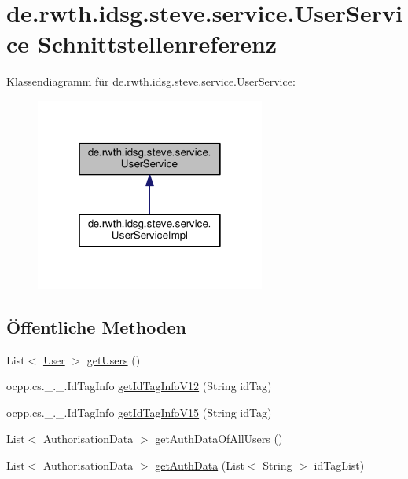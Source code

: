 \hypertarget{interfacede_1_1rwth_1_1idsg_1_1steve_1_1service_1_1_user_service}{\section{de.\-rwth.\-idsg.\-steve.\-service.\-User\-Service Schnittstellenreferenz}
\label{interfacede_1_1rwth_1_1idsg_1_1steve_1_1service_1_1_user_service}
}


Klassendiagramm für de.\-rwth.\-idsg.\-steve.\-service.\-User\-Service\-:
\nopagebreak
\begin{figure}[H]
\begin{center}
\leavevmode
\includegraphics[width=214pt]{interfacede_1_1rwth_1_1idsg_1_1steve_1_1service_1_1_user_service__inherit__graph}
\end{center}
\end{figure}
\subsection*{Öffentliche Methoden}
\begin{DoxyCompactItemize}
\item 
List$<$ \hyperlink{classde_1_1rwth_1_1idsg_1_1steve_1_1repository_1_1dto_1_1_user}{User} $>$ \hyperlink{interfacede_1_1rwth_1_1idsg_1_1steve_1_1service_1_1_user_service_ad1e17f9e1ba85c0f8cdaddf6ad1e2155}{get\-Users} ()
\item 
ocpp.\-cs.\-\_.\-\_.\-Id\-Tag\-Info \hyperlink{interfacede_1_1rwth_1_1idsg_1_1steve_1_1service_1_1_user_service_aecec185f70f45c2ffbfa52102ad24351}{get\-Id\-Tag\-Info\-V12} (String id\-Tag)
\item 
ocpp.\-cs.\-\_.\-\_.\-Id\-Tag\-Info \hyperlink{interfacede_1_1rwth_1_1idsg_1_1steve_1_1service_1_1_user_service_ae94cc84ab7f42d40f9728561cb790ded}{get\-Id\-Tag\-Info\-V15} (String id\-Tag)
\item 
List$<$ Authorisation\-Data $>$ \hyperlink{interfacede_1_1rwth_1_1idsg_1_1steve_1_1service_1_1_user_service_a4704a1c7c6b562d23d4ff73241de2745}{get\-Auth\-Data\-Of\-All\-Users} ()
\item 
List$<$ Authorisation\-Data $>$ \hyperlink{interfacede_1_1rwth_1_1idsg_1_1steve_1_1service_1_1_user_service_aee48bb3da55087e236e001bdf59df9d7}{get\-Auth\-Data} (List$<$ String $>$ id\-Tag\-List)
\end{DoxyCompactItemize}


